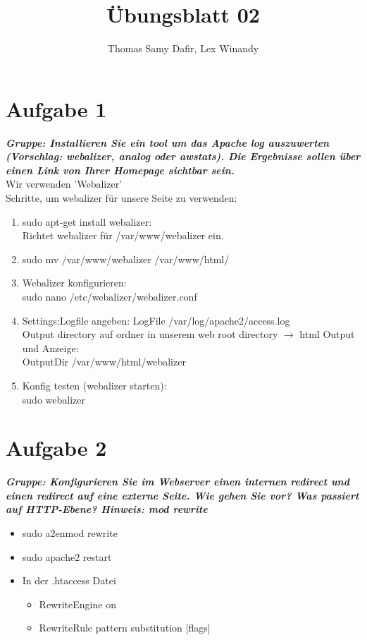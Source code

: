 \documentclass[12pt, a4paper]{report}
\title{Übungsblatt 02}
\author{Thomas Samy Dafir, Lex Winandy}
\date{}
\begin{document}
\maketitle

\section*{Aufgabe 1}
\textbf{\textit{Gruppe: Installieren Sie ein tool um das Apache log auszuwerten (Vorschlag: webalizer, analog oder awstats). Die Ergebnisse sollen über einen Link von Ihrer Homepage sichtbar sein.}}\\
Wir verwenden 'Webalizer'\\
Schritte, um webalizer für unsere Seite zu verwenden:\\
\begin{enumerate}
	\item sudo apt-get install webalizer:\\
	Richtet webalizer für /var/www/webalizer ein.
	\item sudo mv /var/www/webalizer /var/www/html/
	\item Webalizer konfigurieren:\\
	sudo nano /etc/webalizer/webalizer.conf
	\item Settings:Logfile angeben:
	LogFile /var/log/apache2/access.log\\
	Output directory auf ordner in unserem web root directory $\rightarrow$ html Output und Anzeige:\\
	OutputDir /var/www/html/webalizer
	\item Konfig testen (webalizer starten):\\
	sudo webalizer
\end{enumerate}


\section*{Aufgabe 2}
\textbf{\textit{Gruppe: Konfigurieren Sie im Webserver einen internen redirect und einen redirect auf eine externe Seite. Wie gehen Sie vor? Was passiert auf HTTP-Ebene? Hinweis: mod rewrite}}\\
\begin{itemize}
	\item sudo a2enmod rewrite
	\item sudo apache2 restart
	\item In der .htaccess Datei
	\begin{itemize}
		\item RewriteEngine on
		\item RewriteRule pattern substitution [flags]
	\end{itemize}
\end{itemize}
\end{document}
